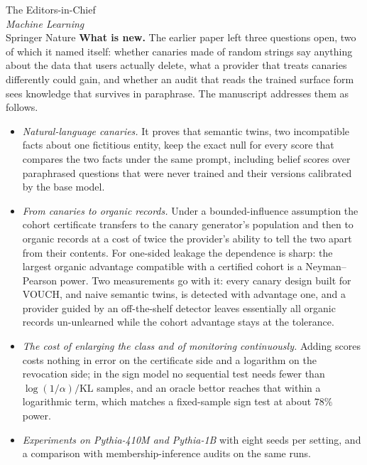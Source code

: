\documentclass[10pt,a4paper]{letter}
\begin{document}
\begin{letter}{The Editors-in-Chief\\\emph{Machine Learning}\\Springer Nature}
\textbf{What is new.} The earlier paper left three questions open, two of which it
named itself: whether canaries made of random strings say anything about the data that
users actually delete, what a provider that treats canaries differently could gain, and
whether an audit that reads the trained surface form sees knowledge that survives in
paraphrase. The manuscript addresses them as follows.
\begin{itemize}
\item \emph{Natural-language canaries.} It proves that semantic twins, two incompatible
facts about one fictitious entity, keep the exact null for every score that compares the
two facts under the same prompt, including belief scores over paraphrased questions that
were never trained and their versions calibrated by the base model.
\item \emph{From canaries to organic records.} Under a bounded-influence assumption the
cohort certificate transfers to the canary generator's population and then to organic
records at a cost of twice the provider's ability to tell the two apart from their
contents. For one-sided leakage the dependence is sharp: the largest organic advantage
compatible with a certified cohort is a Neyman--Pearson power. Two measurements go with
it: every canary design built for VOUCH, and naive semantic twins, is detected with
advantage one, and a provider guided by an off-the-shelf detector leaves essentially all
organic records un-unlearned while the cohort advantage stays at the tolerance.
\item \emph{The cost of enlarging the class and of monitoring continuously.} Adding
scores costs nothing in error on the certificate side and a logarithm on the revocation
side; in the sign model no sequential test needs fewer than $\log(1/\alpha)/\mathrm{KL}$
samples, and an oracle bettor reaches that within a logarithmic term, which matches a
fixed-sample sign test at about $78\%$ power.
\item \emph{Experiments on Pythia-410M and Pythia-1B} with eight seeds per setting, and
a comparison with membership-inference audits on the same runs.
\end{itemize}


\end{letter}
\end{document}
